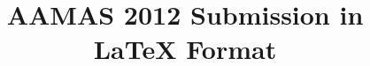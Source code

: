 \documentclass{aamas2012}
\begin{document}


\title{AAMAS 2012  Submission in LaTeX Format}




%
%
%
%

%

\end{document}
